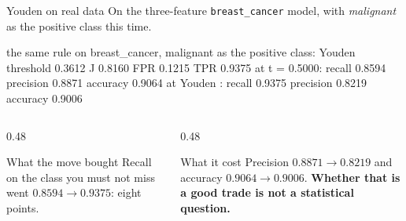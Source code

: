 \documentclass[aspectratio=169]{beamer}
\begin{document}
\begin{frame}[fragile,shrink=7]{Youden on real data}
On the three-feature \texttt{breast\_cancer} model, with \emph{malignant} as
the positive class this time.
\begin{outblk}
the same rule on breast_cancer, malignant as the positive class:
  Youden threshold 0.3612   J 0.8160   FPR 0.1215   TPR 0.9375
  at t = 0.5000: recall 0.8594  precision 0.8871  accuracy 0.9064
  at Youden    : recall 0.9375  precision 0.8219  accuracy 0.9006
\end{outblk}
\begin{columns}[T]
  \begin{column}{0.48\textwidth}
    \begin{block}{What the move bought}
      \footnotesize Recall on the class you must not miss went
      $0.8594 \to \mathbf{0.9375}$: eight points.
    \end{block}
  \end{column}
  \begin{column}{0.48\textwidth}
    \begin{alertblock}{What it cost}
      \footnotesize Precision $0.8871 \to 0.8219$ and accuracy
      $0.9064 \to 0.9006$. \textbf{Whether that is a good trade is not a
      statistical question.}
    \end{alertblock}
  \end{column}
\end{columns}
\end{frame}
\end{document}
